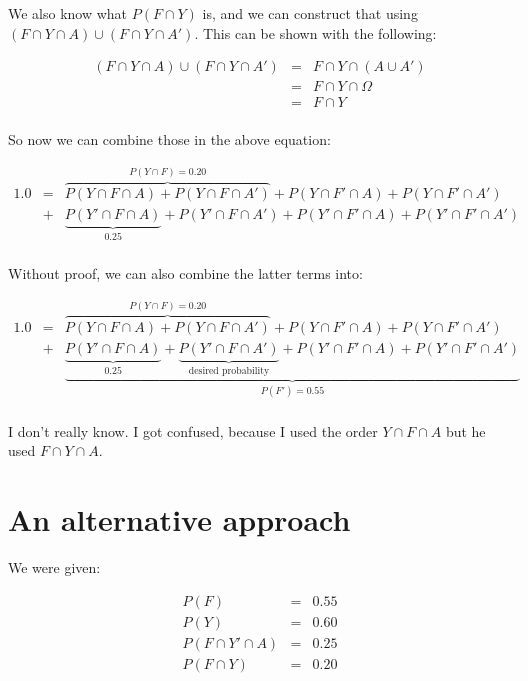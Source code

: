 \documentclass{article}
\begin{document}
We also know what $P(F\cap{}Y)$ is, and we can construct that using
$(F\cap{}Y\cap{}A)\cup(F\cap{}Y\cap{}A')$. This can be shown with the
following:

\[
\begin{array}{rcl}
(F\cap{}Y\cap{}A)\cup(F\cap{}Y\cap{}A') & = & F\cap Y\cap (A\cup A') \\
                                        & = & F\cap Y\cap\Omega \\
                                        & = & F\cap Y \\
\end{array}
\]

So now we can combine those in the above equation:

\[
\begin{array}{rcl}
1.0 & = &
\overbrace{P(Y\cap F\cap A) + P(Y\cap F\cap A')}^{P(Y\cap F)=0.20} +
P(Y\cap F'\cap A) +
P(Y\cap F'\cap A') \\
    & + &
\underbrace{P(Y'\cap F\cap A)}_{0.25} +
P(Y'\cap F\cap A') +
P(Y'\cap F'\cap A) +
P(Y'\cap F'\cap A') \\
\end{array}
\]

Without proof, we can also combine the latter terms into:

\[
\begin{array}{rcl}
1.0 & = &
\overbrace{P(Y\cap F\cap A) + P(Y\cap F\cap A')}^{P(Y\cap F)=0.20} +
P(Y\cap F'\cap A) +
P(Y\cap F'\cap A') \\
    & + &
\underbrace{\underbrace{P(Y'\cap F\cap A)}_{0.25} +
\underbrace{P(Y'\cap F\cap A')}_{\text{desired probability}} +
P(Y'\cap F'\cap A) +
P(Y'\cap F'\cap A')}_{P(F')=0.55} \\
\end{array}
\]

I don't really know. I got confused, because I used the order
$Y\cap{}F\cap{}A$ but he used $F\cap{}Y\cap{}A$.

\section*{An alternative approach}

We were given:

\[
\begin{array}{rcl}
P(F) & = & 0.55 \\
P(Y) & = & 0.60 \\
P(F\cap Y'\cap A) & = & 0.25 \\
P(F\cap Y) & = & 0.20
\end{array}
\]
\end{document}
